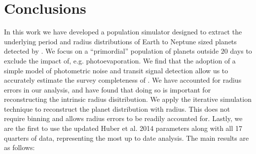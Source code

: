 \section{Conclusions}
In this work we have developed a population simulator designed to
extract the underlying period and radius distributions of Earth to Neptune
sized planets detected by \kep{}. We focus on a ``primordial'' population of
planets outside $20$ days to exclude the impact of, e.g. photoevaporation.
We find that the adoption of a simple model of photometric noise and
transit signal detection allow us to accurately estimate the 
survey completeness of \kep{}.  We have accounted
for radius errors in our analysis, and have found that doing so is
important for reconstructing the intrinsic radius disitribution. We
apply the iterative simulation technique to reconstruct the planet distribution
with radius. This does not require binning and allows radius errors to be
readily accounted for. Lastly, we are the first to use
the updated Huber et al. 2014 parameters along with all 17 quarters of
\kep{} data, representing the most up to date analysis. The main
results are as follows: 
